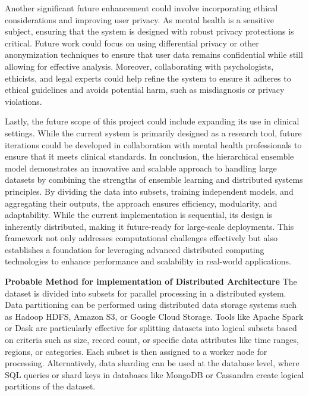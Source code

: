 \vspace{1em}
\noindent
Another significant future enhancement could involve incorporating ethical considerations and improving user privacy. As mental health is a sensitive subject, ensuring that the system is designed with robust privacy protections is critical. Future work could focus on using differential privacy or other anonymization techniques to ensure that user data remains confidential while still allowing for effective analysis. Moreover, collaborating with psychologists, ethicists, and legal experts could help refine the system to ensure it adheres to ethical guidelines and avoids potential harm, such as misdiagnosis or privacy violations.

\vspace{1em}
\noindent
Lastly, the future scope of this project could include expanding its use in clinical settings. While the current system is primarily designed as a research tool, future iterations could be developed in collaboration with mental health professionals to ensure that it meets clinical standards. In conclusion, the hierarchical ensemble model demonstrates an innovative and scalable approach to handling large datasets by combining the strengths of ensemble learning and distributed systems principles. By dividing the data into subsets, training independent models, and aggregating their outputs, the approach ensures efficiency, modularity, and adaptability. While the current implementation is sequential, its design is inherently distributed, making it future-ready for large-scale deployments. This framework not only addresses computational challenges effectively but also establishes a foundation for leveraging advanced distributed computing technologies to enhance performance and scalability in real-world applications.

\vspace{1em}

\noindent
\textbf{Probable Method for implementation of Distributed Architecture}
\newline
\noindent
The dataset is divided into subsets for parallel processing in a distributed system. Data partitioning can be performed using distributed data storage systems such as Hadoop HDFS, Amazon S3, or Google Cloud Storage. Tools like Apache Spark or Dask are particularly effective for splitting datasets into logical subsets based on criteria such as size, record count, or specific data attributes like time ranges, regions, or categories. Each subset is then assigned to a worker node for processing. Alternatively, data sharding can be used at the database level, where SQL queries or shard keys in databases like MongoDB or Cassandra create logical partitions of the dataset.

